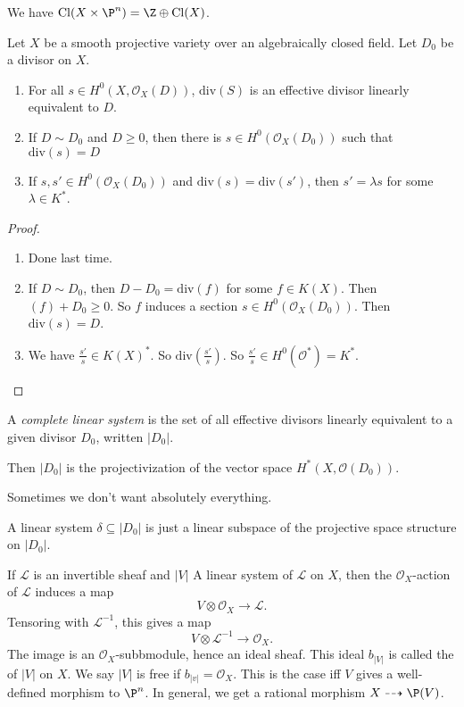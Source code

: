 \documentclass[a4paper]{article}
\renewcommand\div{\mathrm{div}}
\newcommand\Cl{\mathrm{Cl}}
\begin{document}
\begin{ex}
  We have $\Cl(X \times \P^n) = \Z \oplus \Cl(X)$.
\end{ex}

\begin{prop}
  Let $X$ be a smooth projective variety over an algebraically closed field. Let $D_0$ be a divisor on $X$.
  \begin{enumerate}
    \item For all $s \in H^0(X, \mathcal{O}_X(D))$, $\div(S)$ is an effective divisor linearly equivalent to $D$.
    \item If $D \sim D_0$ and $D \geq 0$, then there is $s \in H^0(\mathcal{O}_X(D_0))$ such that $\div(s) = D$
    \item If $s, s' \in H^0(\mathcal{O}_X(D_0))$ and $\div(s) = \div(s')$, then $s' = \lambda s$ for some $\lambda \in K^*$.
  \end{enumerate}
\end{prop}
\begin{proof}\leavevmode
  \begin{enumerate}
    \item Done last time.
    \item If $D \sim D_0$, then $D - D_0 = \div(f)$ for some $f \in K(X)$. Then $(f) + D_0 \geq 0$. So $f$ induces a section $s \in H^0(\mathcal{O}_X(D_0))$. Then $\div(s) = D$.
    \item We have $\frac{s'}{s} \in K(X)^*$. So $\div\left(\frac{s'}{s}\right)$. So $\frac{s'}{s} \in H^0(\mathcal{O}^*) = K^*$.\qedhere
  \end{enumerate}
\end{proof}

\begin{defi}
  A \emph{complete linear system} is the set of all effective divisors linearly equivalent to a given divisor $D_0$, written $|D_0|$.
\end{defi}
Then $|D_0|$ is the projectivization of the vector space $H^*(X, \mathcal{O}(D_0))$.


Sometimes we don't want absolutely everything.
\begin{defi}
  A linear system $\delta \subseteq |D_0|$ is just a linear subspace of the projective space structure on $|D_0|$.
\end{defi}

If $\mathcal{L}$ is an invertible sheaf and $|V|$ A linear system of $\mathcal{L}$ on $X$, then the $\mathcal{O}_X$-action of $\mathcal{L}$ induces a map
\[
  V \otimes \mathcal{O}_X \to \mathcal{L}.
\]
Tensoring with $\mathcal{L}^{-1}$, this gives a map
\[
  V \otimes \mathcal{L}^{-1} \to \mathcal{O}_X.
\]
The image is an $\mathcal{O}_X$-subbmodule, hence an ideal sheaf. This ideal $b_{|V|}$ is called the  of $|V|$ on $X$. We say $|V|$ is free if $b_{|v|} = \mathcal{O}_X$. This is the case iff $V$ gives a well-defined morphism to $\P^n$. In general, we get a rational morphism $X \dashrightarrow \P(V)$.
\end{document}
